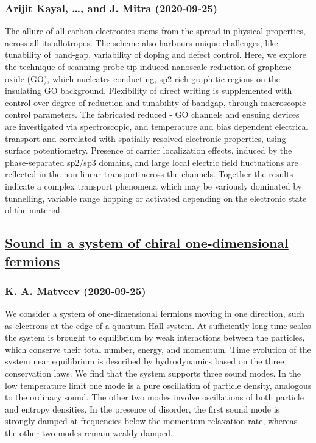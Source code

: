 \subsubsection*{Arijit Kayal, \dots, and J. Mitra (2020-09-25)}
The allure of all carbon electronics stems from the spread in physical
properties, across all its allotropes. The scheme also harbours unique
challenges, like tunability of band-gap, variability of doping and defect
control. Here, we explore the technique of scanning probe tip induced nanoscale
reduction of graphene oxide (GO), which nucleates conducting, sp2 rich
graphitic regions on the insulating GO background. Flexibility of direct
writing is supplemented with control over degree of reduction and tunability of
bandgap, through macroscopic control parameters. The fabricated reduced - GO
channels and ensuing devices are investigated via spectroscopic, and
temperature and bias dependent electrical transport and correlated with
spatially resolved electronic properties, using surface potentiometry. Presence
of carrier localization effects, induced by the phase-separated sp2/sp3
domains, and large local electric field fluctuations are reflected in the
non-linear transport across the channels. Together the results indicate a
complex transport phenomena which may be variously dominated by tunnelling,
variable range hopping or activated depending on the electronic state of the
material.

\subsection*{\href{http://arxiv.org/abs/2009.12364v1}{Sound in a system of chiral one-dimensional fermions}}
\subsubsection*{K. A. Matveev (2020-09-25)}
We consider a system of one-dimensional fermions moving in one direction,
such as electrons at the edge of a quantum Hall system. At sufficiently long
time scales the system is brought to equilibrium by weak interactions between
the particles, which conserve their total number, energy, and momentum. Time
evolution of the system near equilibrium is described by hydrodynamics based on
the three conservation laws. We find that the system supports three sound
modes. In the low temperature limit one mode is a pure oscillation of particle
density, analogous to the ordinary sound. The other two modes involve
oscillations of both particle and entropy densities. In the presence of
disorder, the first sound mode is strongly damped at frequencies below the
momentum relaxation rate, whereas the other two modes remain weakly damped.

